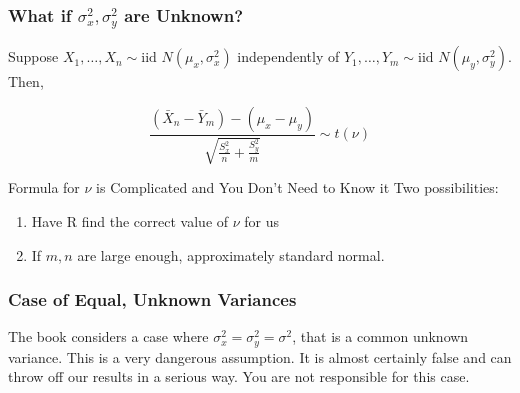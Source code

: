 \begin{frame}
\frametitle{What if $\sigma_x^2,\sigma_y^2$ are Unknown?}
Suppose $X_1, \hdots, X_{n} \sim \mbox{iid } N(\mu_x, \sigma^2_x)$ independently of $Y_1, \hdots, Y_{m} \sim \mbox{iid } N(\mu_y, \sigma^2_y)$. Then,

\vspace{1em}
$$\frac{\left(\bar{X}_n - \bar{Y}_m\right) - (\mu_x - \mu_y)}{\sqrt{\displaystyle\frac{S_x^2}{n} + \frac{S_y^2}{m} }}\sim t(\nu)$$
\vspace{1em}

\begin{block}{Formula for $\nu$ is Complicated and You Don't Need to Know it}
Two possibilities:
	\begin{enumerate}
		\item Have R find the correct value of $\nu$ for us
		\item If $m,n$ are large enough, approximately standard normal. 
	\end{enumerate}
\end{block}

\end{frame}
\begin{frame}
\frametitle{Case of Equal, Unknown Variances}

The book considers a case where $\sigma^2_x = \sigma^2_y = \sigma^2$, that is a common unknown variance. This is a \alert{very dangerous assumption}. It is almost certainly false and can throw off our results in a serious way. You are not responsible for this case.
\end{frame}

